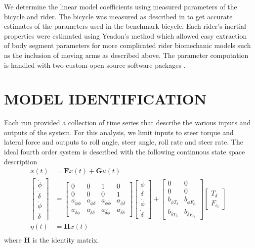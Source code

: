 \documentclass[twocolumn,10pt]{asme2e}
\begin{document}
We determine the linear model coefficients using measured parameters of the
bicycle and rider. The bicycle was measured as described in \cite{Moore2010} to
get accurate estimates of the parameters used in the benchmark bicycle.  Each
rider's inertial properties were estimated using Yeadon's method
\cite{Yeadon1990a} which allowed easy extraction of body segment parameters for
more complicated rider biomechanic models such as the inclusion of moving arms
as described above. The parameter computation is handled with two custom open
source software packages \cite{Moore2011a,Dembia2011}.
%
\section*{MODEL IDENTIFICATION}
Each run provided a collection of time series that describe the various inputs
and outputs of the system. For this analysis, we limit inputs to steer torque
and lateral force and outputs to roll angle, steer angle, roll rate and steer
rate. The ideal fourth order system is described with the following continuous
state space description
\begin{equation}
	\begin{split}
		\dot{x}(t) & =
		\mathbf{F}x(t) + \mathbf{G}u(t)\\
		\begin{bmatrix}
			\dot{\phi} \\
			\dot{\delta} \\
			\ddot{\phi} \\
			\ddot{\delta}
		\end{bmatrix}
		& =
		\begin{bmatrix}
			0 & 0 & 1 & 0\\
			0 & 0 & 0 & 1\\
			a_{\ddot{\phi}\phi} & a_{\ddot{\phi}\delta} &
			a_{\ddot{\phi}\dot{\phi}} & a_{\ddot{\phi}\dot{\delta}}\\
			a_{\ddot{\delta}\phi} & a_{\ddot{\delta}\delta} &
			a_{\ddot{\delta}\dot{\phi}} & a_{\ddot{\delta}\dot{\delta}}
		\end{bmatrix}
		\begin{bmatrix}
			\phi \\
			\delta \\
			\dot{\phi} \\
			\dot{\delta}
		\end{bmatrix}
		+
		\begin{bmatrix}
			0 & 0 \\
			0 & 0\\
			b_{\ddot{\phi}T_\delta} & b_{\ddot{\phi}F_{c_l}}\\
			b_{\ddot{\delta}T_\delta} & b_{\ddot{\delta}F_{c_l}}
		\end{bmatrix}
		\begin{bmatrix}
			T_\delta\\
			F_{c_l}
		\end{bmatrix}\\
		\eta(t) & = \mathbf{H}x(t)\\
	\end{split}
\end{equation}
where $\mathbf{H}$ is the identity matrix.
\end{document}
